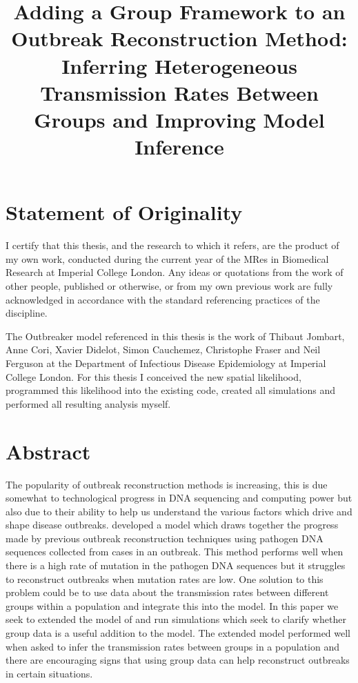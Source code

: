 \documentclass[11pt,a4paper]{report}
\title{Adding a Group Framework to an Outbreak Reconstruction Method: Inferring Heterogeneous Transmission Rates Between Groups and Improving Model Inference}
\begin{document}
\maketitle




\chapter*{Statement of Originality}
\thispagestyle{empty}
\noindent I certify that this thesis, and the research to which it refers, are the product of my own work, conducted during the current year of the MRes in Biomedical Research at Imperial College London. Any ideas or quotations from the work of other people, published or otherwise, or from my own previous work are fully acknowledged in accordance with the standard referencing practices of the discipline. 


The Outbreaker model referenced in this thesis is the work of Thibaut Jombart, Anne Cori, Xavier Didelot, Simon Cauchemez, Christophe Fraser and Neil Ferguson at the Department of Infectious Disease Epidemiology at Imperial College London. For this thesis I conceived the new spatial likelihood, programmed this likelihood into the existing code, created all simulations and performed all resulting analysis myself.
\newpage

\chapter*{Abstract}
\thispagestyle{empty}
The popularity of outbreak reconstruction methods is increasing, this is due somewhat to technological progress in DNA sequencing and computing power but also due to their ability to help us understand the various factors which drive and shape disease outbreaks. \citet{outbrkr} developed a model which draws together the progress made by previous outbreak reconstruction techniques using pathogen DNA sequences collected from cases in an outbreak. This method performs well when there is a high rate of mutation in the pathogen DNA sequences but it struggles to reconstruct outbreaks when mutation rates are low. One solution to this problem could be to use data about the transmission rates between different groups within a population and integrate this into the model. In this paper we seek to extended the model of \citet{outbrkr} and run simulations which seek to clarify whether group data is a useful addition to the model. The extended model performed well when asked to infer the transmission rates between groups in a population and there are encouraging signs that using group data can help reconstruct outbreaks in certain situations.
\end{document}
